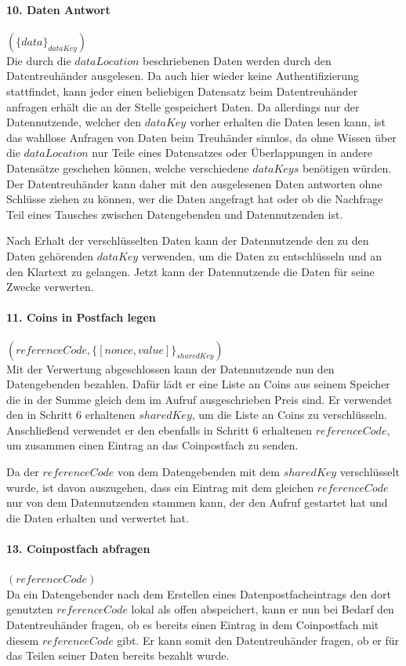 \documentclass{scrreprt}
\begin{document}
\paragraph{10. Daten Antwort} $(\{data\}_{dataKey})$\\
Die durch die $dataLocation$ beschriebenen Daten werden durch den Datentreuhänder ausgelesen. Da auch hier wieder keine Authentifizierung stattfindet, kann jeder einen beliebigen Datensatz beim Datentreuhänder anfragen erhält die an der Stelle gespeichert Daten. Da allerdings nur der Datennutzende, welcher den $dataKey$ vorher erhalten die Daten lesen kann, ist das wahllose Anfragen von Daten beim Treuhänder sinnlos, da ohne Wissen über die $dataLocation$ nur Teile eines Datensatzes oder Überlappungen in andere Datensätze geschehen können, welche verschiedene $dataKeys$ benötigen würden. Der Datentreuhänder kann daher mit den ausgelesenen Daten antworten ohne Schlüsse ziehen zu können, wer die Daten angefragt hat oder ob die Nachfrage Teil eines Tausches zwischen Datengebenden und Datennutzenden ist.

Nach Erhalt der verschlüsselten Daten kann der Datennutzende den zu den Daten gehörenden $dataKey$ verwenden, um die Daten zu entschlüsseln und an den Klartext zu gelangen. Jetzt kann der Datennutzende die Daten für seine Zwecke verwerten.

\paragraph{11. Coins in Postfach legen} $(referenceCode, \{[nonce,value]\}_{sharedKey})$\\
\label{para:payment_9}
Mit der Verwertung abgeschlossen kann der Datennutzende nun den Datengebenden bezahlen. Dafür lädt er eine Liste an Coins aus seinem Speicher die in der Summe gleich dem im Aufruf ausgeschrieben Preis sind. Er verwendet den in Schritt 6 erhaltenen $sharedKey$, um die Liste an Coins zu verschlüsseln. Anschließend verwendet er den ebenfalls in Schritt 6 erhaltenen $referenceCode$, um zusammen einen Eintrag an das Coinpostfach zu senden.

Da der $referenceCode$ von dem Datengebenden mit dem $sharedKey$ verschlüsselt wurde, ist davon auszugehen, dass ein Eintrag mit dem gleichen $referenceCode$ nur von dem Datennutzenden stammen kann, der den Aufruf gestartet hat und die Daten erhalten und verwertet hat.

\paragraph{13. Coinpostfach abfragen} $(referenceCode)$\\
Da ein Datengebender nach dem Erstellen eines Datenpostfacheintrags den dort genutzten $referenceCode$ lokal als offen abspeichert, kann er nun bei Bedarf den Datentreuhänder fragen, ob es bereits einen Eintrag in dem Coinpostfach mit diesem $referenceCode$ gibt. Er kann somit den Datentreuhänder fragen, ob er für das Teilen seiner Daten bereits bezahlt wurde.
\end{document}
